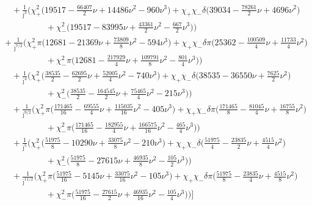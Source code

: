 \documentclass[prd,superscriptaddress,preprintnumbers,tightenlines,nofootinbib, eqsecnum]{revtex4-2}
\newcommand{\nn}{\nonumber}
\begin{document}
\begin{align}
&\qquad\qquad + \frac{1}{\bar{\jmath}^{3}}\Bigg(\chi_{+}^{2}\bigg(19517 - \frac{66407}{2}\nu + 14486 \nu^{2} - 960 \nu^{3}\bigg) + \chi_{+}\chi_{-}\delta\bigg(39034 - \frac{78261}{2}\nu + 4696 \nu^{2}\bigg) \nn \\
&\qquad\qquad\qquad\qquad + \chi_{-}^{2}\bigg(19517 - 83995 \nu + \frac{43361}{2}\nu^{2} - \frac{667}{2}\nu^{3}\bigg)\Bigg) \nn \\
&\qquad\quad + \frac{1}{\bar{\jmath}^{7/2}}\Bigg(\chi_{+}^{2}\pi\bigg(12681 - 21369 \nu + \frac{73809}{8}\nu^{2} - 594 \nu^{3}\bigg) + \chi_{+}\chi_{-}\delta\pi\bigg(25362 - \frac{100509}{4}\nu + \frac{11733}{4}\nu^{2}\bigg) \nn \\
&\qquad\qquad\qquad\qquad + \chi_{-}^{2}\pi\bigg(12681 - \frac{217929}{4}\nu + \frac{109791}{8}\nu^{2} - \frac{801}{4}\nu^{3}\bigg)\Bigg) \nn \\
&\qquad\qquad + \frac{1}{\bar{\jmath}^{4}}\Bigg(\chi_{+}^{2}\bigg(\frac{38535}{2} - \frac{62695}{2}\nu + \frac{52005}{4}\nu^{2} - 740 \nu^{3}\bigg) + \chi_{+}\chi_{-}\delta\bigg(38535 - 36550 \nu + \frac{7625}{2}\nu^{2}\bigg) \nn \\
&\qquad\qquad\qquad\qquad + \chi_{-}^{2}\bigg(\frac{38535}{2} - \frac{164545}{2}\nu + \frac{75465}{4}\nu^{2} - 215 \nu^{3}\bigg)\Bigg) \nn \\
&\qquad\qquad + \frac{1}{\bar{\jmath}^{9/2}}\Bigg(\chi_{+}^{2}\pi\bigg(\frac{171465}{16} - \frac{69555}{4}\nu + \frac{115035}{16}\nu^{2} - 405 \nu^{3}\bigg) + \chi_{+}\chi_{-}\delta\pi\bigg(\frac{171465}{8} - \frac{81045}{4}\nu + \frac{16755}{8}\nu^{2}\bigg) \nn \\
&\qquad\qquad\qquad\qquad + \chi_{-}^{2}\pi\bigg(\frac{171465}{16} - \frac{182955}{4}\nu + \frac{166575}{16}\nu^{2} - \frac{465}{4}\nu^{3}\bigg)\Bigg) \nn \\
&\qquad\qquad + \frac{1}{\bar{\jmath}^{5}}\Bigg(\chi_{+}^{2}\bigg(\frac{51975}{8} - 10290 \nu + \frac{33075}{8}\nu^{2} - 210 \nu^{3}\bigg) + \chi_{+}\chi_{-}\delta\bigg(\frac{51975}{4} - \frac{23835}{2}\nu + \frac{4515}{4}\nu^{2}\bigg) \nn \\
&\qquad\qquad\qquad\qquad + \chi_{-}^{2}\bigg(\frac{51975}{8} - 27615 \nu + \frac{46935}{8}\nu^{2} - \frac{105}{2}\nu^{3}\bigg)\Bigg) \nn \\
&\qquad\qquad + \frac{1}{\bar{\jmath}^{11/2}}\Bigg(\chi_{+}^{2}\pi\bigg(\frac{51975}{16} - 5145 \nu + \frac{33075}{16}\nu^{2} - 105 \nu^{3}\bigg) + \chi_{+}\chi_{-}\delta\pi\bigg(\frac{51975}{8} - \frac{23835}{4}\nu + \frac{4515}{8}\nu^{2}\bigg) \nn \\
&\qquad\qquad\qquad\qquad + \chi_{-}^{2}\pi\bigg(\frac{51975}{16} - \frac{27615}{2}\nu + \frac{46935}{16}\nu^{2} - \frac{105}{4}\nu^{3}\bigg)\Bigg)\Bigg]
\end{align}
\end{document}
